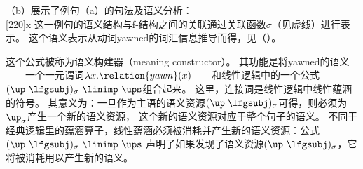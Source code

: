 （b）展示了例句（a）的句法及语义分析：
\eal
{}
\ex ~\\[-\baselineskip]
\hspace*{-2em}
{}%
\hspace*{3em}%
{}%
\hspace*{2em}%
\Aput*{$\phi$}
[220]{x}
\Bput*{$\sigma$}
\zl
% 
这一例句的语义结构与f-结构之间的关联通过关联函数$\sigma$（见虚线）进行表示。
这个语义表示从动词yawned的词汇信息推导而得，见（）。

\ea
{}
\z

\noindent 
这个公式被称为语义构建器（meaning constructor）。
其功能是将yawned的语义——一个一元谓词$\lambda x. \relation{yawn}(x)$——和线性逻辑中的一个公式\is{\linimp}
\mbox{$(\up\ \lfgsubj)_\sigma\ \linimp\ \ups$}组合起来。
这里，连接词\linimp 是线性逻辑中线性蕴涵的符号。
其意义为：一旦作为主语的语义资源$(\up\;\lfgsubj)_\sigma$可得，则必须为$\up_\sigma$产生一个新的语义资源，
这个新的语义资源对应于整个句子的语义。 
不同于经典逻辑里的蕴涵算子，线性蕴涵必须被消耗并产生新的语义资源：公式\mbox{$(\up\ \lfgsubj)_\sigma\ \linimp\ \ups$}
声明了如果发现了语义资源\mbox{$(\up\  \lfgsubj)_\sigma$}，它将被消耗用以产生新的语义\ups。

